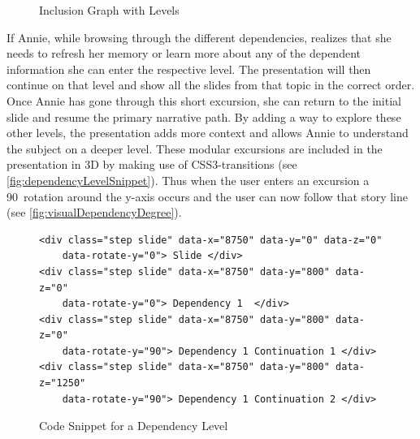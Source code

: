 \documentclass[twoside, 12pt]{article}
\begin{document}
\begin{figure}
\vspace{-16pt}
  \begin{center}
\vspace{-20pt}
  \caption{Inclusion Graph with Levels}
  \label{fig:levelsGraph}
\vspace{0pt}
  \end{center}
\end{figure}

\begin{figure}
\vspace{-70pt}
\end{figure}

If Annie, while browsing through the different dependencies, realizes that she needs to refresh her memory or learn more about any of the dependent information she can enter the respective level. The presentation will then continue on that level and show all the slides from that topic in the correct order. Once Annie has gone through this short excursion, she can return to the initial slide and resume the primary narrative path. By adding a way to explore these other levels, the presentation adds more context and allows Annie to understand the subject on a deeper level. These modular excursions are included in the presentation in 3D by making use of CSS3-transitions (see \autoref{fig:dependencyLevelSnippet}). Thus when the user enters an excursion a 90\degree\ rotation around the y-axis occurs and the user can now follow that story line (see \autoref{fig:visualDependencyDegree}).

\begin{figure}
\vspace{-22pt}
\begin{verbatim}
<div class="step slide" data-x="8750" data-y="0" data-z="0"
	data-rotate-y="0"> Slide </div>
<div class="step slide" data-x="8750" data-y="800" data-z="0" 
	data-rotate-y="0"> Dependency 1  </div>
<div class="step slide" data-x="8750" data-y="800" data-z="0" 
	data-rotate-y="90"> Dependency 1 Continuation 1 </div>
<div class="step slide" data-x="8750" data-y="800" data-z="1250" 
	data-rotate-y="90"> Dependency 1 Continuation 2 </div>
\end{verbatim}
\vspace{-8pt}
  \caption{Code Snippet for a Dependency Level}
  \label{fig:dependencyLevelSnippet}
  \vspace{12pt}
\end{figure}
\end{document}
